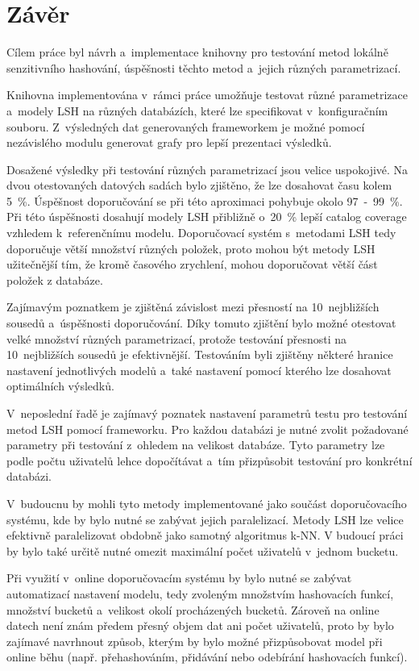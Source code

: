 \documentclass[11pt]{article}
\begin{document}
\section{Závěr}
Cílem práce byl návrh a~implementace knihovny pro testování metod lokálně senzitivního hashování, úspěšnosti těchto metod a~jejich různých parametrizací.
	
	Knihovna implementována v~rámci práce umožňuje testovat různé parametrizace a~modely LSH na různých databázích, které lze specifikovat v~konfiguračním souboru. Z~výsledných dat generovaných frameworkem je možné pomocí nezávislého modulu generovat grafy pro lepší prezentaci výsledků.
	
	Dosažené výsledky při testování různých parametrizací jsou velice uspokojivé. Na dvou otestovaných datových sadách bylo zjištěno, že lze dosahovat času kolem 5~\%. Úspěšnost doporučování se při této aproximaci pohybuje okolo 97~-~99~\%. Při této úspěšnosti dosahují modely LSH přibližně o~20~\% lepší catalog coverage vzhledem k~referenčnímu modelu. Doporučovací systém s~metodami LSH tedy doporučuje větší množství různých položek, proto mohou být metody LSH užitečnější tím, že kromě časového zrychlení, mohou doporučovat větší část položek z databáze.
	
	Zajímavým poznatkem je zjištěná závislost mezi přesností na 10~nejbližších sousedů a~úspěšnosti doporučování. Díky tomuto zjištění bylo možné otestovat velké množství různých parametrizací, protože testování přesnosti na 10~nejbližších sousedů je efektivnější. Testováním byli zjištěny některé hranice nastavení jednotlivých modelů a~také nastavení pomocí kterého lze dosahovat optimálních výsledků.
	
	V~neposlední řadě je zajímavý poznatek nastavení parametrů testu pro testování metod LSH pomocí frameworku. Pro každou databázi je nutné zvolit požadované parametry při testování z~ohledem na velikost databáze. Tyto parametry lze podle počtu uživatelů lehce dopočítávat a~tím přizpůsobit testování pro konkrétní databázi.
	
	V~budoucnu by mohli tyto metody implementované jako součást doporučovacího systému, kde by bylo nutné se zabývat jejich paralelizací. Metody LSH lze velice efektivně paralelizovat obdobně jako samotný algoritmus k-NN. V budoucí práci by bylo také určitě nutné omezit maximální počet uživatelů v~jednom bucketu.

Při využití v~online doporučovacím systému by bylo nutné se zabývat automatizací nastavení modelu, tedy zvoleným množstvím hashovacích funkcí, množství bucketů a~velikost okolí procházených bucketů. Zároveň na online datech není znám předem přesný objem dat ani počet uživatelů, proto by bylo zajímavé navrhnout způsob, kterým by bylo možné přizpůsobovat model při online běhu (např. přehashováním, přidávání nebo odebírání hashovacích funkcí). 
	
 
\clearpage
\thispagestyle{empty}


\end{document}
